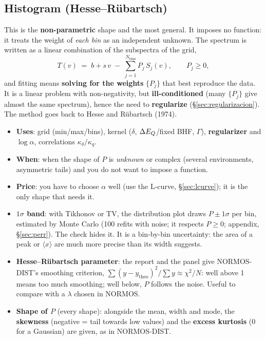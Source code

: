 \subsection{Histogram (Hesse--Rübartsch)}
\label{sec:forma-histograma}

This is the \textbf{non-parametric} shape and the most general. It imposes no
function: it treats the weight of \emph{each bin} as an independent unknown. The
spectrum is written as a linear combination of the subspectra of the grid,
\[
  T(v) \;=\; b + s\,v \;-\; \sum_{j=1}^{N_{\text{bins}}} P_j\, S_j(v),
  \qquad P_j \ge 0,
\]
and fitting means \textbf{solving for the weights} $\{P_j\}$ that best reproduce the
data. It is a linear problem with non-negativity, but \textbf{ill-conditioned} (many
$\{P_j\}$ give almost the same spectrum), hence the need to \textbf{regularize}
(\S\ref{sec:regularizacion}). The method goes back to Hesse and Rübartsch (1974).

\begin{itemize}[nosep]
  \item \textbf{Uses}: grid (min/max/bins), kernel ($\delta$, $\Delta E_{Q}$/fixed BHF,
        $\Gamma$), \textbf{regularizer} and $\log\alpha$, correlations
        $\kappa_\delta/\kappa_q$.
  \item \textbf{When}: when the shape of $P$ is \emph{unknown} or complex (several
        environments, asymmetric tails) and you do not want to impose a function.
  \item \textbf{Price}: you have to choose $\alpha$ well (use the L-curve,
        \S\ref{sec:lcurve}); it is the only shape that needs it.
  \item \textbf{$1\sigma$ band}: with Tikhonov or TV, the distribution plot
        draws $P\pm1\sigma$ per bin, estimated by Monte Carlo (100 refits with
        noise; it respects $P\ge0$; appendix, \S\ref{sec:perr}). The
         check hides it. It is a bin-by-bin
        uncertainty: the area of a peak or $\langle x\rangle$ are much more
        precise than its width suggests.
  \item \textbf{Hesse--Rübartsch parameter}: the report and the panel give
        NORMOS-DIST's smoothing criterion,
        $\sum(y-y_\mathrm{theo})^2/\sum y \approx \chi^2/N$: well above 1 means
        too much smoothing; well below, $P$ follows the noise. Useful to
        compare with a $\lambda$ chosen in NORMOS.
  \item \textbf{Shape of $P$} (every shape): alongside the mean, width and mode,
        the \textbf{skewness} (negative = tail towards low values) and the
        \textbf{excess kurtosis} (0 for a Gaussian) are given, as in NORMOS-DIST.
\end{itemize}

